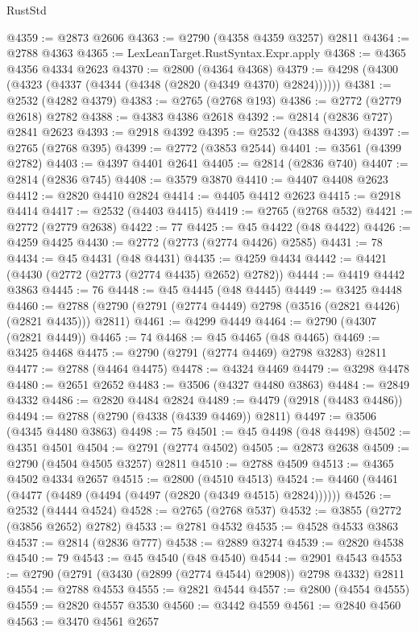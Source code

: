 \begin{lexlean}{RustStd}
\begin{coremodule}
@4359 := @2873 @2606
@4363 := @2790 (@4358 @4359 @3257) @2811
@4364 := @2788 @4363
@4365 := LexLeanTarget.RustSyntax.Expr.apply
@4368 := @4365 @4356 @4334 @2623
@4370 := @2800 (@4364 @4368)
@4379 := @4298 (@4300 (@4323 (@4337 (@4344 (@4348 (@2820 (@4349 @4370) @2824))))))
@4381 := @2532 (@4282 @4379)
@4383 := @2765 (@2768 @193)
@4386 := @2772 (@2779 @2618) @2782
@4388 := @4383 @4386 @2618
@4392 := @2814 (@2836 @727) @2841 @2623
@4393 := @2918 @4392
@4395 := @2532 (@4388 @4393)
@4397 := @2765 (@2768 @395)
@4399 := @2772 (@3853 @2544)
@4401 := @3561 (@4399 @2782)
@4403 := @4397 @4401 @2641
@4405 := @2814 (@2836 @740)
@4407 := @2814 (@2836 @745)
@4408 := @3579 @3870
@4410 := @4407 @4408 @2623
@4412 := @2820 @4410 @2824
@4414 := @4405 @4412 @2623
@4415 := @2918 @4414
@4417 := @2532 (@4403 @4415)
@4419 := @2765 (@2768 @532)
@4421 := @2772 (@2779 @2638)
@4422 := 77
@4425 := @45 @4422 (@48 @4422)
@4426 := @4259 @4425
@4430 := @2772 (@2773 (@2774 @4426) @2585)
@4431 := 78
@4434 := @45 @4431 (@48 @4431)
@4435 := @4259 @4434
@4442 := @4421 (@4430 (@2772 (@2773 (@2774 @4435) @2652) @2782))
@4444 := @4419 @4442 @3863
@4445 := 76
@4448 := @45 @4445 (@48 @4445)
@4449 := @3425 @4448
@4460 := @2788 (@2790 (@2791 (@2774 @4449) @2798 (@3516 (@2821 @4426) (@2821 @4435))) @2811)
@4461 := @4299 @4449
@4464 := @2790 (@4307 (@2821 @4449))
@4465 := 74
@4468 := @45 @4465 (@48 @4465)
@4469 := @3425 @4468
@4475 := @2790 (@2791 (@2774 @4469) @2798 @3283) @2811
@4477 := @2788 (@4464 @4475)
@4478 := @4324 @4469
@4479 := @3298 @4478
@4480 := @2651 @2652
@4483 := @3506 (@4327 @4480 @3863)
@4484 := @2849 @4332
@4486 := @2820 @4484 @2824
@4489 := @4479 (@2918 (@4483 @4486))
@4494 := @2788 (@2790 (@4338 (@4339 @4469)) @2811)
@4497 := @3506 (@4345 @4480 @3863)
@4498 := 75
@4501 := @45 @4498 (@48 @4498)
@4502 := @4351 @4501
@4504 := @2791 (@2774 @4502)
@4505 := @2873 @2638
@4509 := @2790 (@4504 @4505 @3257) @2811
@4510 := @2788 @4509
@4513 := @4365 @4502 @4334 @2657
@4515 := @2800 (@4510 @4513)
@4524 := @4460 (@4461 (@4477 (@4489 (@4494 (@4497 (@2820 (@4349 @4515) @2824))))))
@4526 := @2532 (@4444 @4524)
@4528 := @2765 (@2768 @537)
@4532 := @3855 (@2772 (@3856 @2652) @2782)
@4533 := @2781 @4532
@4535 := @4528 @4533 @3863
@4537 := @2814 (@2836 @777)
@4538 := @2889 @3274
@4539 := @2820 @4538
@4540 := 79
@4543 := @45 @4540 (@48 @4540)
@4544 := @2901 @4543
@4553 := @2790 (@2791 (@3430 (@2899 (@2774 @4544) @2908)) @2798 @4332) @2811
@4554 := @2788 @4553
@4555 := @2821 @4544
@4557 := @2800 (@4554 @4555)
@4559 := @2820 @4557 @3530
@4560 := @3442 @4559
@4561 := @2840 @4560
@4563 := @3470 @4561 @2657

\end{coremodule}
\end{lexlean}
